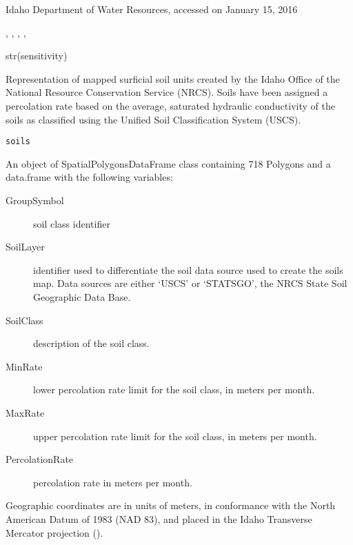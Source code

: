 \documentclass[a4paper]{book}
\begin{document}
%
\begin{Source}\relax
Idaho Department of Water Resources, accessed on January 15, 2016
\end{Source}
%
\begin{SeeAlso}\relax
{}, ,
, , 
\end{SeeAlso}
%
\begin{Examples}
\begin{ExampleCode}
str(sensitivity)

\end{ExampleCode}
\end{Examples}
%
\begin{Description}\relax
Representation of mapped surficial soil units created by the Idaho Office of the
National Resource Conservation Service (NRCS).
Soils have been assigned a percolation rate based on the average,
saturated hydraulic conductivity of the soils as classified using the
Unified Soil Classification System (USCS).
\end{Description}
%
\begin{Usage}
\begin{verbatim}
soils
\end{verbatim}
\end{Usage}
%
\begin{Format}
An object of SpatialPolygonsDataFrame class containing 718 Polygons and a
data.frame with the following variables:
\begin{description}

\item[GroupSymbol] soil class identifier
\item[SoilLayer] identifier used to differentiate the soil data source
used to create the soils map.
Data sources are either `USCS' or `STATSGO',
the NRCS State Soil Geographic Data Base.
\item[SoilClass] description of the soil class.
\item[MinRate] lower percolation rate limit for the soil class, in meters per month.
\item[MaxRate] upper percolation rate limit for the soil class, in meters per month.
\item[PercolationRate] percolation rate in meters per month.

\end{description}

Geographic coordinates are in units of meters, in conformance with the
North American Datum of 1983 (NAD 83), and placed in the
Idaho Transverse Mercator projection ().
\end{Format}
\end{document}
